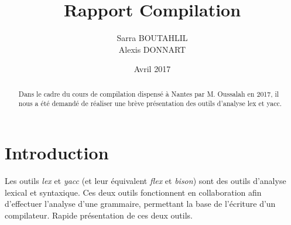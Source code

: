 \documentclass[a4paper,11pt]{article}
\newcommand{\br}{\\\mbox{}}
\begin{document}

\title{Rapport Compilation}
\date{Avril 2017}
\author{Sarra BOUTAHLIL\br Alexis DONNART}


\maketitle

\begin{abstract}
Dans le cadre du cours de compilation dispensé à Nantes par M. Oussalah en 2017, il nous a été demandé de réaliser une brève présentation des outils d'analyse lex et yacc.\br
\end{abstract}

\pagebreak 

\tableofcontents

\pagebreak 


\pagebreak 


\section{Introduction}
Les outils \textit{lex} et \textit{yacc} (et leur équivalent \textit{flex} et \textit{bison}) sont des outils d'analyse lexical et syntaxique. Ces deux outils fonctionnent en collaboration afin d'effectuer l'analyse d'une grammaire, permettant la base de l'écriture d'un compilateur. Rapide présentation de ces deux outils.
\end{document}
